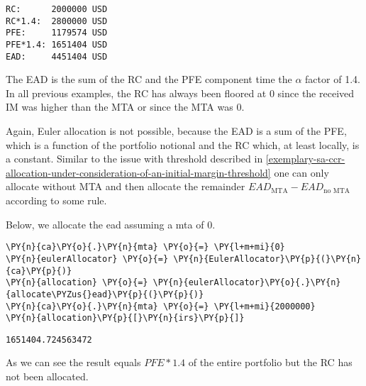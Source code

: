     \begin{Verbatim}[commandchars=\\\{\}]
RC:      2000000 USD
RC*1.4:  2800000 USD
PFE:     1179574 USD
PFE*1.4: 1651404 USD
EAD:     4451404 USD
    \end{Verbatim}

    The EAD is the sum of the RC and the PFE component time the \(\alpha\)
factor of 1.4. In all previous examples, the RC has always been floored
at 0 since the received IM was higher than the MTA or since the MTA was
0.

Again, Euler allocation is not possible, because the EAD is a sum of the
PFE, which is a function of the portfolio notional and the RC which, at
least locally, is a constant. Similar to the issue with threshold
described in
\ref{exemplary-sa-ccr-allocation-under-consideration-of-an-initial-margin-threshold}
one can only allocate without MTA and then allocate the remainder
\(EAD_{\text{MTA}}-EAD_{\text{no MTA}}\) according to some rule.

Below, we allocate the ead assuming a mta of 0.

    \begin{tcolorbox}[breakable, size=fbox, boxrule=1pt, pad at break*=1mm,colback=cellbackground, colframe=cellborder]
\begin{Verbatim}[commandchars=\\\{\}]
\PY{n}{ca}\PY{o}{.}\PY{n}{mta} \PY{o}{=} \PY{l+m+mi}{0}
\PY{n}{eulerAllocator} \PY{o}{=} \PY{n}{EulerAllocator}\PY{p}{(}\PY{n}{ca}\PY{p}{)}
\PY{n}{allocation} \PY{o}{=} \PY{n}{eulerAllocator}\PY{o}{.}\PY{n}{allocate\PYZus{}ead}\PY{p}{(}\PY{p}{)}
\PY{n}{ca}\PY{o}{.}\PY{n}{mta} \PY{o}{=} \PY{l+m+mi}{2000000}
\PY{n}{allocation}\PY{p}{[}\PY{n}{irs}\PY{p}{]}
\end{Verbatim}
\end{tcolorbox}

            \begin{tcolorbox}[breakable, size=fbox, boxrule=.5pt, pad at break*=1mm, opacityfill=0]
\begin{Verbatim}[commandchars=\\\{\}]
1651404.724563472
\end{Verbatim}
\end{tcolorbox}
        
    As we can see the result equals \(PFE*1.4\) of the entire portfolio but
the RC has not been allocated.

